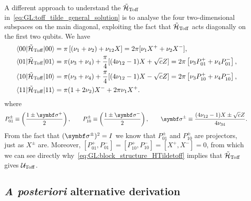 A different approach to understand the $\tilde{{\mathcal{H}}}_{\operatorname{Toff}}$ in~\cref{eq:GL:toff_tilde_general_solution} is to analyse the four two-dimensional subspaces on the main diagonal, exploiting the fact that $\tilde{{\mathcal{H}}}_{\operatorname{Toff}}$ acts diagonally on the first two qubits.
We have
\begin{equation}
\begin{aligned}
	\mel{00}{\tilde{{\mathcal{H}}}_{\operatorname{Toff}}}{00} &=
    \pi \left[(\nu_1+\nu_2)+\nu_{12} X\right] =
    2\pi[\nu_1 X^+ + \nu_2 X^-], \\
	\mel{01}{\tilde{{\mathcal{H}}}_{\operatorname{Toff}}}{01} &=
    \pi(\nu_3+\nu_4) + \frac{\pi}{4}[(4\nu_{12}-1) X + \sqrt{c} Z] =
    2\pi\left[\nu_3 P_{01}^+ + \nu_4 P_{01}^-\right], \\
	\mel{10}{\tilde{{\mathcal{H}}}_{\operatorname{Toff}}}{10} &=
    \pi(\nu_3+\nu_4) + \frac{\pi}{4}[(4\nu_{12}-1) X - \sqrt{c} Z] =
    2\pi\left[\nu_3 P_{10}^+ + \nu_4 P_{10}^-\right], \\
	\mel{11}{\tilde{{\mathcal{H}}}_{\operatorname{Toff}}}{11} &=
    \pi(1 + 2\nu_2) X^- + 2\pi \nu_1 X^+.
\end{aligned}
\label{eq:GL:block_structure_HTildetoff}
\end{equation}
where
\begin{equation}
    P_{01}^\pm \equiv \left(\frac{1\pm\bs\sigma^+}{2}\right), \qquad
    P_{10}^\pm \equiv \left(\frac{1\pm\bs\sigma^-}{2}\right), \qquad
    \bs\sigma^\pm \equiv \frac{(4\nu_{12}-1)X\pm\sqrt c Z}{4\nu_{34}}.
\end{equation}
From the fact that $(\bs\sigma^\pm)^2=I$ we know that $P_{01}^\pm$ and $P_{10}^\pm$ are projectors, just as $X^\pm$ are. Moreover, $[P_{01}^+,P_{01}^-]=[P_{10}^+,P_{10}^-]=[X^+,X^-]=0$, from which we can see directly why~\cref{eq:GL:block_structure_HTildetoff} implies that $\tilde{{\mathcal{H}}}_{\operatorname{Toff}}$ gives ${\mathcal{U}}_{\operatorname{Toff}}$.


\subsection{\textit{A posteriori} alternative derivation}
\label{subsec:GL:toffoli_posteriori_derivation}

